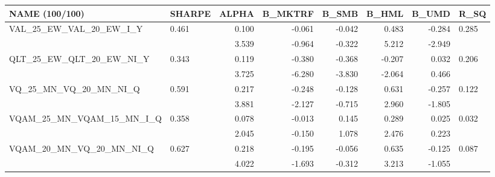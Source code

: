 \begin{tabular}{llrrrrrl}
\toprule
NAME (100/100) & SHARPE & ALPHA & B\_MKTRF & B\_SMB & B\_HML & B\_UMD & R\_SQ \\
\midrule
VAL\_25\_EW\_VAL\_20\_EW\_I\_Y & 0.461 & 0.100 & -0.061 & -0.042 & 0.483 & -0.284 & 0.285 \\
 &  & 3.539 & -0.964 & -0.322 & 5.212 & -2.949 &  \\
QLT\_25\_EW\_QLT\_20\_EW\_NI\_Y & 0.343 & 0.119 & -0.380 & -0.368 & -0.207 & 0.032 & 0.206 \\
 &  & 3.725 & -6.280 & -3.830 & -2.064 & 0.466 &  \\
VQ\_25\_MN\_VQ\_20\_MN\_NI\_Q & 0.591 & 0.217 & -0.248 & -0.128 & 0.631 & -0.257 & 0.122 \\
 &  & 3.881 & -2.127 & -0.715 & 2.960 & -1.805 &  \\
VQAM\_25\_MN\_VQAM\_15\_MN\_I\_Q & 0.358 & 0.078 & -0.013 & 0.145 & 0.289 & 0.025 & 0.032 \\
 &  & 2.045 & -0.150 & 1.078 & 2.476 & 0.223 &  \\
VQAM\_20\_MN\_VQ\_20\_MN\_NI\_Q & 0.627 & 0.218 & -0.195 & -0.056 & 0.635 & -0.125 & 0.087 \\
 &  & 4.022 & -1.693 & -0.312 & 3.213 & -1.055 &  \\
\bottomrule
\end{tabular}
